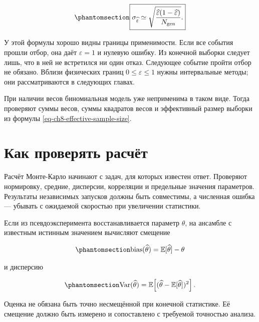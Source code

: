 \documentclass[
  russian,
  11pt,
  a4paper,
  open=any]{scrbook}
\begin{document}
\begin{equation}\protect\phantomsection\label{eq-ch8-selection-efficiency-error}{
\boxed{
\sigma_{\widehat\varepsilon}
\simeq
\sqrt{\frac{
\widehat\varepsilon(1-\widehat\varepsilon)
}{N_{\mathrm{gen}}}}.
}
}\end{equation}

У этой формулы хорошо видны границы применимости. Если все события
прошли отбор, она даёт \(\widehat\varepsilon=1\) и нулевую ошибку. Из
конечной выборки следует лишь, что в ней не встретился ни один отказ.
Следующее событие пройти отбор не обязано. Вблизи физических границ
\(0\leq\varepsilon\leq1\) нужны интервальные методы; они рассматриваются
в следующих главах.

При наличии весов биномиальная модель уже неприменима в таком виде.
Тогда проверяют суммы весов, суммы квадратов весов и эффективный размер
выборки из формулы \ref{eq-ch8-effective-sample-size}.

\section{Как проверять
расчёт}\label{ux43aux430ux43a-ux43fux440ux43eux432ux435ux440ux44fux442ux44c-ux440ux430ux441ux447ux451ux442}

Расчёт Монте-Карло начинают с задач, для которых известен ответ.
Проверяют нормировку, средние, дисперсии, корреляции и предельные
значения параметров. Результаты независимых запусков должны быть
совместимы, а численная ошибка --- убывать с ожидаемой скоростью при
увеличении статистики.

Если из псевдоэксперимента восстанавливается параметр \(\theta\), на
ансамбле с известным истинным значением вычисляют смещение

\begin{equation}\protect\phantomsection\label{eq-ch8-estimator-bias}{
\operatorname{bias}(\widehat\theta)
=\mathbb E[\widehat\theta]-\theta
}\end{equation}

и дисперсию

\begin{equation}\protect\phantomsection\label{eq-ch8-estimator-variance}{
\operatorname{Var}(\widehat\theta)
=\mathbb E\!\left[
(\widehat\theta-\mathbb E[\widehat\theta])^2
\right].
}\end{equation}

Оценка не обязана быть точно несмещённой при конечной статистике. Её
смещение должно быть измерено и сопоставлено с требуемой точностью
анализа.
\end{document}
